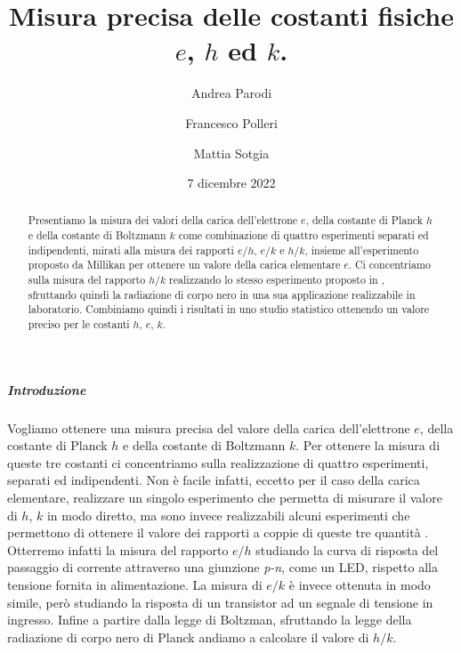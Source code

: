 \documentclass[a4paper, varvw, nofootinbib]{revtex4-2}
\begin{document}
\title{Misura precisa delle costanti fisiche $e$, $h$ ed $k$.}
\author{Andrea Parodi}
\author{Francesco Polleri}
\author{Mattia Sotgia}
\date{7 dicembre 2022}

\begin{abstract}
Presentiamo la misura dei valori della carica dell'elettrone $e$, della costante di Planck $h$ e della costante di Boltzmann $k$ come combinazione di quattro esperimenti separati ed indipendenti, mirati alla misura dei rapporti $e/h$, $e/k$ \cite{inmanMeasurementIntroductoryPhysics1973} e $h/k$, insieme all'esperimento proposto da Millikan \cite{millikanIsolationIonPrecision1911} per ottenere un valore della carica elementare $e$. Ci concentriamo sulla misura del rapporto $h/k$ realizzando lo stesso esperimento proposto in \cite{crandallMinimalApparatusDetermination1983}, sfruttando quindi la radiazione di corpo nero in una sua applicazione realizzabile in laboratorio. Combiniamo quindi i risultati in uno studio statistico ottenendo un valore preciso per le costanti $h$, $e$, $k$.
\end{abstract}

\maketitle

\subparagraph*{Introduzione} Vogliamo ottenere una misura precisa del valore della carica dell'elettrone $e$, della costante di Planck $h$ e della costante di Boltzmann $k$. Per ottenere la misura di queste tre costanti ci concentriamo sulla realizzazione di quattro esperimenti, separati ed indipendenti. Non è facile infatti, eccetto per il caso della carica elementare, realizzare un singolo esperimento che permetta di misurare il valore di $h$, $k$ in modo diretto, ma sono invece realizzabili alcuni esperimenti che permettono di ottenere il valore dei rapporti a coppie di queste tre quantità \cite{inmanMeasurementIntroductoryPhysics1973, millikanIsolationIonPrecision1911, crandallMinimalApparatusDetermination1983}. Otterremo infatti la misura del rapporto $e/h$ studiando la curva di risposta del passaggio di corrente attraverso una giunzione \emph{p-n}, come un {LED}, rispetto alla tensione fornita in alimentazione. La misura di $e/k$ è invece ottenuta in modo simile, però studiando la risposta di un transistor ad un segnale di tensione in ingresso. Infine a partire dalla legge di Boltzman, sfruttando la legge della radiazione di corpo nero di Planck andiamo a calcolare il valore di $h/k$. 
\end{document}
